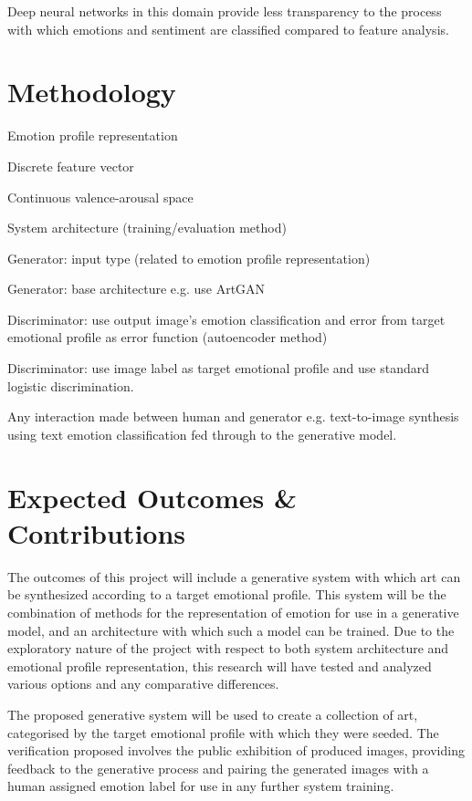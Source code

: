 \documentclass{article}
\begin{document}
Deep neural networks in this domain provide less transparency to the process with which emotions and sentiment are classified compared to feature analysis.


\section{Methodology}

\begin{todolist}
	\item Emotion profile representation
	\begin{todolist}
		\item Discrete feature vector
		\item Continuous valence-arousal space
	\end{todolist}
	\item System architecture (training/evaluation method)
	\begin{todolist}
		\item Generator: input type (related to emotion profile representation)
		\item Generator: base architecture e.g. use ArtGAN \citep{tan2017artgan}
		\item Discriminator: use output image's emotion classification and error from target emotional profile as error function (autoencoder method)
		\item Discriminator: use image label as target emotional profile and use standard logistic discrimination.
	\end{todolist}
	\item Any interaction made between human and generator e.g. text-to-image synthesis using text emotion classification fed through to the generative model.
	
\end{todolist}


\section{Expected Outcomes \& Contributions}

The outcomes of this project will include a generative system with which art can be synthesized according to a target emotional profile.
This system will be the combination of methods for the representation of emotion for use in a generative model, and an architecture with which such a model can be trained.
Due to the exploratory nature of the project with respect to both system architecture and emotional profile representation, this research will have tested and analyzed various options and any comparative differences.

The proposed generative system will be used to create a collection of art, categorised by the target emotional profile with which they were seeded.
The verification proposed involves the public exhibition of produced images, providing feedback to the generative process and pairing the generated images with a human assigned emotion label for use in any further system training.




\end{document}

